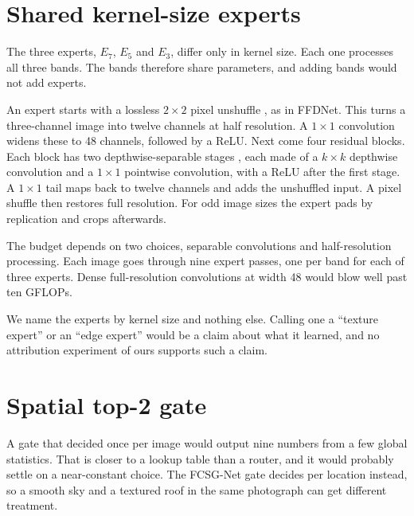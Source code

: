 \documentclass[12pt,a4paper,oneside]{NITR}
\newcommand{\fcsg}{FCSG-Net}
\begin{document}
\section{Shared kernel-size experts}\label{sec:experts}

The three experts, $E_7$, $E_5$ and $E_3$, differ only in kernel size. Each
one processes all three bands. The bands therefore share parameters, and
adding bands would not add experts.

An expert starts with a lossless $2\times2$ pixel unshuffle
\cite{shi2016espcn}, as in FFDNet. This turns a three-channel image into
twelve channels at half resolution. A $1\times1$ convolution widens these to
48 channels, followed by a ReLU. Next come four residual blocks. Each block
has two depthwise-separable stages \cite{chollet2017xception}, each made of a
$k\times k$ depthwise convolution and a $1\times1$ pointwise convolution, with
a ReLU after the first stage. A $1\times1$ tail maps back to twelve channels
and adds the unshuffled input. A pixel shuffle then restores full resolution.
For odd image sizes the expert pads by replication and crops afterwards.

The budget depends on two choices, separable convolutions and
half-resolution processing. Each image goes through nine expert passes, one
per band for each of three experts. Dense full-resolution convolutions at
width 48 would blow well past ten GFLOPs.

We name the experts by kernel size and nothing else. Calling one a ``texture
expert'' or an ``edge expert'' would be a claim about what it learned, and no
attribution experiment of ours supports such a claim.

\section{Spatial top-2 gate}\label{sec:gate}

A gate that decided once per image would output nine numbers from a few
global statistics. That is closer to a lookup table than a router, and it
would probably settle on a near-constant choice. The \fcsg{} gate decides per
location instead, so a smooth sky and a textured roof in the same photograph
can get different treatment.
\end{document}
